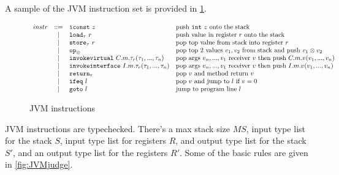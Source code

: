 \documentclass{article}
\begin{document}
A sample of the JVM instruction set is provided in \ref{fig:JVMinstr}.
\begin{figure}
\centering
$\begin{array}{r c l l}
instr{}
& ::= & \texttt{iconst} ~ z & \text{push \texttt{int} $z$ onto the stack} \\
& \mid & \texttt{load}_{\tau} ~ r & \text{push value in register $r$ onto the stack} \\
& \mid & \texttt{store}_{\tau} ~ r & \text{pop top value from stack into register $r$} \\
& \mid & \texttt{op}_{\otimes} & \text{pop top 2 values $v_1, v_2$ from stack and push $v_1 \otimes v_2$} \\
& \mid & \texttt{invokevirtual} ~ C . m . \tau_r (\tau_1, ..., \tau_n) & \text{pop args $v_n, ..., v_1$ receiver{} $v$ then push $C.m.v(v_1,...,v_n)$}  \\
& | & \texttt{invokeinterface} ~ I . m . \tau_r (\tau_1, ..., \tau_n) & \text{pop args $v_n, ..., v_1$ receiver{} $v$ then push $I.m.v(v_1,...,v_n)$}  \\
& \mid & \texttt{return}_{\tau} & \text{pop $v$ and method return $v$} \\
& | & \texttt{ifeq} ~ l & \text{pop $v$ and jump to $l$ if $v = 0$} \\
& \mid & \texttt{goto} ~ l & \text{jump to program line $l$}
\end{array}$
\caption{JVM instructions}
\label{fig:JVMinstr}
\end{figure}

JVM instructions are typechecked. There's a max stack size $MS$, input type list for the stack $S$, input type list for registers $R$, and output type list for the stack $S'$, and an output type list for the registers $R'$. Some of the basic rules are given in \ref{fig:JVMjudge}.
\end{document}
